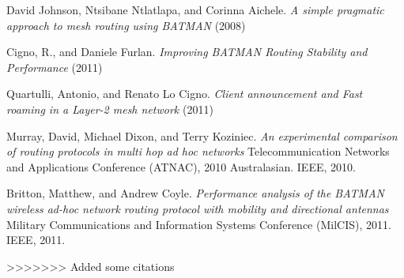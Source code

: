 \documentclass[11pt]{article}
\begin{document}
\begin{thebibliography}{1}



David Johnson, Ntsibane Ntlatlapa, and Corinna Aichele.
\textit{A simple pragmatic approach to mesh routing using BATMAN} (2008)

Cigno, R., and Daniele Furlan.
\textit{Improving BATMAN Routing Stability and Performance} (2011)

Quartulli, Antonio, and Renato Lo Cigno.
\textit{Client announcement and Fast roaming in a Layer-2 mesh network} (2011)

Murray, David, Michael Dixon, and Terry Koziniec.
\textit{An experimental comparison of routing protocols in multi hop ad hoc networks} Telecommunication Networks and Applications Conference (ATNAC), 2010 Australasian. IEEE, 2010.

Britton, Matthew, and Andrew Coyle.
\textit{Performance analysis of the BATMAN wireless ad-hoc network routing protocol with mobility and directional antennas} Military Communications and Information Systems Conference (MilCIS), 2011. IEEE, 2011.

\end{thebibliography}
>>>>>>> Added some citations
\end{document}
